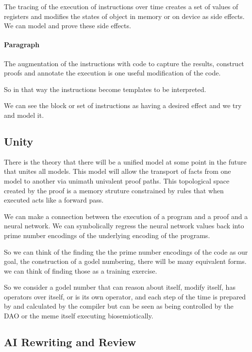 \documentclass{article}
\begin{document}
The tracing of the execution of instructions over time
creates a set of values of registers and modifies the states
of object in memory or on device as side effects.
We can model and prove these side effects.

\paragraph{Paragraph}

The augmentation of the instructions with code
to capture the results, construct proofs and annotate the execution
is one useful modification of the code. 

So in that way the instructions become templates to be interpreted.

We can see the block or set of instructions as having a desired effect
and we try and model it. 

\subsection{Unity}

There is the theory
that there will be a unified model at some point in the future that unites all models. This model will allow the transport of facts from one model to another via unimath univalent proof paths. This topological space created by the proof is a memory struture constrained by rules that when executed acts like a forward pass.

We can make a connection between the execution of a program and a proof and a neural network. We can symbolically regress the neural network values back into prime number encodings of the underlying encoding of the programs.

So we can think of the finding the the prime number encodings of the code as our goal, the construction of a godel numbering, there will be many equivalent forms. we can think of finding those as a training exercise.

So we consider a godel number that can reason about itself, modify itself, has operators over itself, or is its own operator, and each step of the time is prepared by and calculated by the compiler but can be seen as being controlled by the DAO or the meme itself executing biosemiotically.

\subsection{AI Rewriting and Review}
\end{document}
